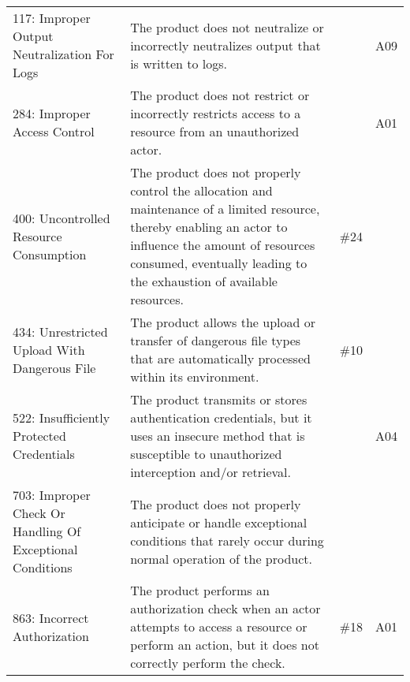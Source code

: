 \begin{table*}[h]
{\begin{tabular}{
p{}
p{}
p{} 
p{}
}
117: Improper Output Neutralization For Logs & The product does not neutralize or incorrectly neutralizes output that is written to logs. & & A09 \\
284: Improper Access Control & The product does not restrict or incorrectly restricts access to a resource from an unauthorized actor. & & A01 \\
400: Uncontrolled Resource Consumption & The product does not properly control the allocation and maintenance of a limited resource, thereby enabling an actor to influence the amount of resources consumed, eventually leading to the exhaustion of available resources. & \#24 &  \\
434: Unrestricted Upload With Dangerous File & The product allows the upload or transfer of dangerous file types that are automatically processed within its environment. & \#10 &  \\
522: Insufficiently Protected Credentials & The product transmits or stores authentication credentials, but it uses an insecure method that is susceptible to unauthorized interception and/or retrieval. & & A04 \\
703: Improper Check Or Handling Of Exceptional Conditions & The product does not properly anticipate or handle exceptional conditions that rarely occur during normal operation of the product. & &  \\
863: Incorrect Authorization & The product performs an authorization check when an actor attempts to access a resource or perform an action, but it does not correctly perform the check. & \#18 & A01 \\
\bottomrule
\end{tabular}}
\end{table*}
